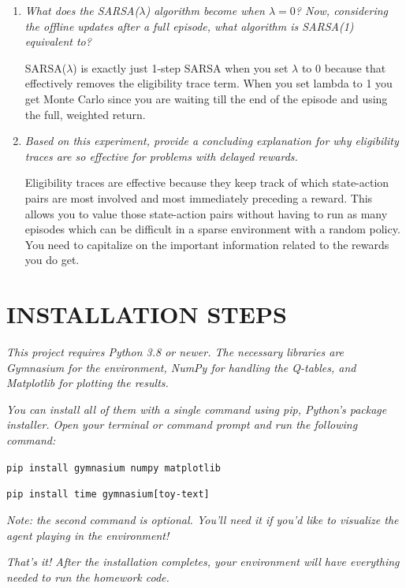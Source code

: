 \documentclass{article}
\begin{document}
\begin{enumerate}
    \item \textit{What does the SARSA($\lambda$) algorithm become when $\lambda = 0$? Now, considering the offline updates after a full episode, what algorithm is SARSA(1) equivalent to?}
    
    SARSA($\lambda$) is exactly just 1-step SARSA when you set $\lambda$ to 0 because that effectively removes the eligibility trace term. When you set lambda to 1 you get Monte Carlo since you are waiting till the end of the episode and using the full, weighted return.
    
    \item \textit{Based on this experiment, provide a concluding explanation for why eligibility traces are so effective for problems with delayed rewards.}
    
    Eligibility traces are effective because they keep track of which state-action pairs are most involved and most immediately preceding a reward. This allows you to value those state-action pairs without having to run as many episodes which can be difficult in a sparse environment with a random policy. You need to capitalize on the important information related to the rewards you do get.
\end{enumerate}

\section{INSTALLATION STEPS}

\textit{This project requires Python 3.8 or newer. The necessary libraries are Gymnasium for the environment, NumPy for handling the Q-tables, and Matplotlib for plotting the results.}

\textit{You can install all of them with a single command using pip, Python's package installer. Open your terminal or command prompt and run the following command:}

\texttt{pip install gymnasium numpy matplotlib}

\texttt{pip install time gymnasium[toy-text]}

\textit{Note: the second command is optional. You’ll need it if you’d like to visualize the agent playing in the environment!}

\textit{That's it! After the installation completes, your environment will have everything needed to run the homework code.}
\end{document}
